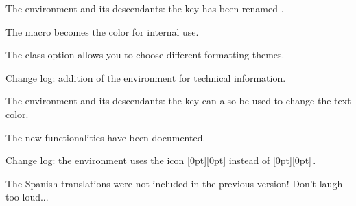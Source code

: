 \documentclass{tutodoc}
\begin{document}
\small

\begin{tdocbreak}
    \item The  environment and its descendants: the  key has been renamed .

    \item The macro  becomes the color  for internal use.
\end{tdocbreak}


\begin{tdocnew}
    \item The  class option allows you to choose different formatting themes.

    \item Change log: addition of the  environment for technical information.

    \item The  environment and its descendants: the  key can also be used to change the text color.

    \item The new functionalities have been documented.
\end{tdocnew}


\begin{tdocupdate}
    \item Change log: the  environment uses the icon
    \raisebox{0pt}[0pt][0pt]{}
    instead of
    \raisebox{0pt}[0pt][0pt]{\fbox{\faMagic}}\,.
\end{tdocupdate}


\begin{tdocfix}
    \item The Spanish translations were not included in the previous version! Don't laugh too loud...
\end{tdocfix}
\end{document}
